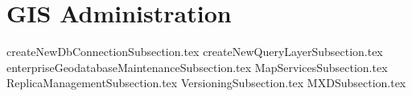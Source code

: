 \documentclass{book}
\title{}  %
\begin{document}
\ifstandalone
\maketitle %
\clearpage
\tableofcontents %
\clearpage
\fi

\section{GIS Administration}
{createNewDbConnectionSubsection.tex}
\clearpage
{createNewQueryLayerSubsection.tex}
\clearpage
{enterpriseGeodatabaseMaintenanceSubsection.tex}
\clearpage
{MapServicesSubsection.tex}
\clearpage
{ReplicaManagementSubsection.tex}
\clearpage
{VersioningSubsection.tex}
\clearpage
{MXDSubsection.tex}
\end{document}
